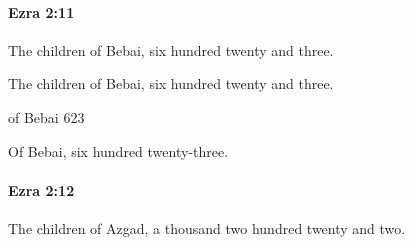 		\paragraph{Ezra 2:11} %
			\label{EZRA-2-11}

			The children of Bebai, six hundred twenty and three.

			\begin{versebox}
					\item[BHS] 
					\item[LXX] 
					\item[ASV] The children of Bebai, six hundred twenty and three.
					\item[NIV] of Bebai 623
					\item[NRSV] Of Bebai, six hundred twenty-three.
			\end{versebox}

		\paragraph{Ezra 2:12} %
			\label{EZRA-2-12}

			The children of Azgad, a thousand two hundred twenty and two.

